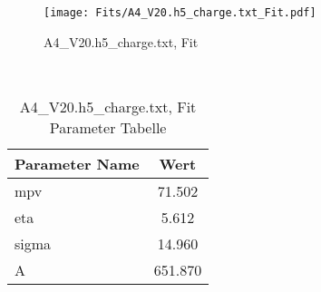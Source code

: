 \begin{figure}[ht] 
 	\centering 
 	\texttt{[image: Fits/A4\_V20.h5\_charge.txt\_Fit.pdf]} 
	\caption{A4_V20.h5_charge.txt, Fit} 
 	\label{fig:A4_V20.h5_charge.txt, Fit} 
\end{figure}
 \\ 
\begin{table}[ht] 
\centering 
\caption{A4_V20.h5_charge.txt, Fit Parameter Tabelle} 
\label{tab:my-table}
\begin{tabular}{|l|c|}
\hline
Parameter Name	&	Wert \\ \hline
mpv	&	 71.502\\ \hline
eta	&	 5.612\\ \hline
sigma	&	 14.960\\ \hline
A	&	 651.870\\ \hline
\end{tabular} 
\end{table}